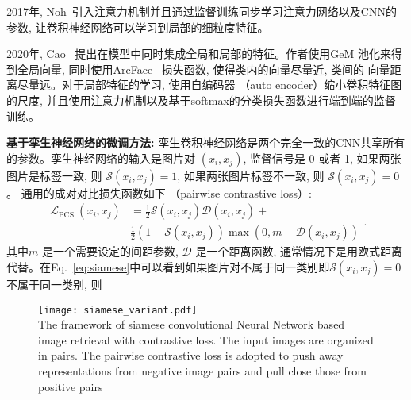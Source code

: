 2017年, Noh~\cite{noh2017large}引入注意力机制并且通过监督训练同步学习注意力网络以及CNN的参数, 让卷积神经网络可以学习到局部的细粒度特征。 \par
2020年, Cao~\cite{cao2020unifying} 提出在模型中同时集成全局和局部的特征。作者使用GeM 池化来得到全局向量, 同时使用ArcFace~\cite{deng2019arcface} 损失函数, 使得类内的向量尽量近, 类间的
向量距离尽量远。对于局部特征的学习, 使用自编码器 （auto encoder）缩小卷积特征图的尺度, 并且使用注意力机制以及基于softmax的分类损失函数进行端到端的监督训练。 \par
\textbf{基于孪生神经网络的微调方法:} 孪生卷积神经网络是两个完全一致的CNN共享所有的参数。孪生神经网络的输入是图片对 $(x_i, x_j)$, 监督信号是 0 或者 1, 如果两张图片是标签一致, 则 $\mathcal{S}(x_i, x_j) = 1$, 如果两张图片标签不一致, 则 $\mathcal{S}(x_i, x_j) = 0$。 通用的成对对比损失函数如下 （pairwise contrastive loss）:
\begin{equation}
    \begin{aligned}
        \mathcal{L}_{\text {PCS }}\left(x_i, x_j\right) & =\frac{1}{2} \mathcal{S}\left(x_i, x_j\right) \mathcal{D}\left(x_i, x_j\right)+ \\
        & \frac{1}{2}\left(1-\mathcal{S}\left(x_i, x_j\right)\right) \max \left(0, m-\mathcal{D}\left(x_i, x_j\right)\right)
        \end{aligned}.
        \label{eq:siamese}
\end{equation}
其中$m$ 是一个需要设定的间距参数, $\mathcal{D}$ 是一个距离函数, 通常情况下是用欧式距离代替。在Eq.~\ref{eq:siamese}中可以看到如果图片对不属于同一类别即$\mathcal{S}(x_i, x_j) = 0$ 不属于同一类别, 则 
\begin{figure}[!htp]
    \centering
    \texttt{[image: siamese\_variant.pdf]} \\
      {The framework of siamese convolutional Neural Network based image retrieval with contrastive loss. The input images are organized in pairs. The pairwise contrastive loss is adopted to push away representations from negative image pairs and pull close those from positive pairs }
   \label{fig:siamesevariant}
\end{figure}


